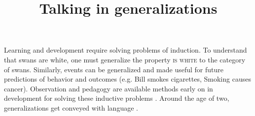 \documentclass[11pt,letterpaper]{article}
\title{Talking in generalizations}
\begin{document}
\maketitle

Learning and development require solving problems of induction.
To understand that swans are white, one must generalize the property \textsc{is white} to the category of swans.
Similarly, events can be generalized and made useful for future predictions of behavior and outcomes (e.g. Bill smokes cigarettes, Smoking causes cancer). 
Observation and pedagogy are available methods early on in development for solving these inductive problems \cite{Markman1989, Shafto2012}.
Around the age of two, generalizations get conveyed with language \cite{Cimpian2008, Gelman2008}. 
\end{document}
